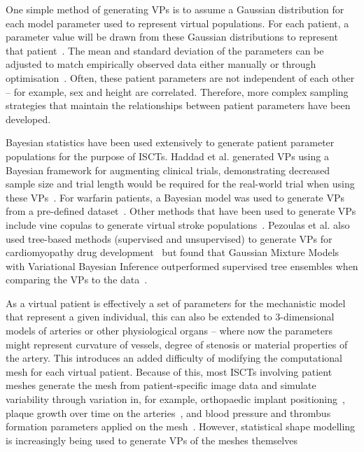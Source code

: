 \documentclass{article}
\begin{document}
One simple method of generating VPs is to assume a Gaussian distribution for each model parameter used to represent virtual populations. 
For each patient, a parameter value will be drawn from these Gaussian distributions to represent that patient~\cite{Gaffney2022, Jenner2021}. 
The mean and standard deviation of the parameters can be adjusted to match empirically observed data either manually or through optimisation~\cite{Alfonso2020}. Often, these patient parameters are not independent of each other – for example, sex and height are correlated.
Therefore, more complex sampling strategies that maintain the relationships between patient parameters have been developed.

Bayesian statistics have been used extensively to generate patient parameter populations for the purpose of ISCTs. Haddad et al. generated VPs using a Bayesian framework for augmenting clinical trials, demonstrating decreased sample size and trial length would be required for the real-world trial when using these VPs~\cite{Haddad2017a}. For warfarin patients, a Bayesian model was used to generate VPs from a pre-defined dataset~\cite{Fusaro2013}. Other methods that have been used to generate VPs include vine copulas to generate virtual stroke populations~\cite{Miller2021}. Pezoulas et al. also used tree-based methods (supervised and unsupervised) to generate VPs for cardiomyopathy drug development~\cite{Pezoulas2020} but found that Gaussian Mixture Models with Variational Bayesian Inference outperformed supervised tree ensembles when comparing the VPs to the data~\cite{Pezoulas2021}.

As a virtual patient is effectively a set of parameters for the mechanistic model that represent a given individual, this can also be extended to 3-dimensional models of arteries or other physiological organs – where now the parameters might represent curvature of vessels, degree of stenosis or material properties of the artery. 
This introduces an added difficulty of modifying the computational mesh for each virtual patient.
Because of this, most ISCTs involving patient meshes generate the mesh from patient-specific image data and simulate variability through variation in, for example, orthopaedic implant positioning~\cite{AlDirini2019}, plaque growth over time on the arteries~\cite{Pleouras2021}, and blood pressure and thrombus formation parameters applied on the mesh~\cite{SarramiForoushani2021}. 
However, statistical shape modelling is increasingly being used to generate VPs of the meshes themselves~\cite{Rodero_2021}
\end{document}
